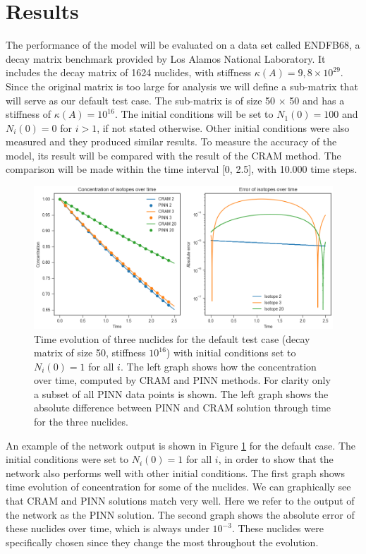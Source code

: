 \documentclass[10pt]{article}
\begin{document}
\section{Results}

The performance of the model will be evaluated on a data set called ENDFB68, a decay matrix benchmark provided by Los Alamos National Laboratory. It includes the decay matrix of 1624 nuclides, with stiffness $\kappa(A) = 9,8\times 10^{29}$. Since the original matrix is too large for analysis we will define a sub-matrix that will serve as our default test case. The sub-matrix is of size 50 $\times$ 50 and has a stiffness of $\kappa(A) = 10^{16}$. The initial conditions will be set to $N_1(0) = 100$ and $N_i(0) = 0$ for $i > 1$, if not stated otherwise. Other initial conditions were also measured and they produced similar results. To measure the accuracy of the model, its result will be compared with the result of the CRAM method. The comparison will be made within the time interval [0, 2.5], with 10.000 time steps.

\begin{figure}
    \centering
    \includegraphics[width = \textwidth]{decay_over_time_trimed.png}
    \caption{Time evolution of three nuclides for the default test case (decay matrix of size 50, stiffness $10^{16}$) with initial conditions set to $N_i(0) = 1$ for all $i$. The left graph shows how the concentration over time, computed by CRAM and PINN methods. For clarity only a subset of all PINN data points is shown. The left graph shows the absolute difference between PINN and CRAM solution through time for the three nuclides.}
    \label{fig:decay_case}
\end{figure}

An example of the network output is shown in Figure \ref{fig:decay_case} for the default case. The initial conditions were set to $N_i(0) = 1$ for all $i$, in order to show that the network also performs well with other initial conditions. The first graph shows time evolution of concentration for some of the nuclides. We can graphically see that CRAM and PINN solutions match very well. Here we refer to the output of the network as the PINN solution. The second graph shows the absolute error of these nuclides over time, which is always under $10^{-3}$. These nuclides were specifically chosen since they change the most throughout the evolution.
\end{document}
